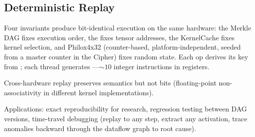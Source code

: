 \subsection{Deterministic Replay}

Four invariants produce bit-identical execution on the same hardware: the Merkle DAG fixes execution order, the  fixes tensor addresses, the KernelCache fixes kernel selection, and Philox4x32 (counter-based, platform-independent, seeded from a master counter in the Cipher) fixes random state.
Each op derives its key from ; each thread generates ---${\sim}10$ integer instructions in registers.

Cross-hardware replay preserves semantics but not bits (floating-point non-associativity in different kernel implementations).

Applications: exact reproducibility for research, regression testing between DAG versions, time-travel debugging (replay to any step, extract any activation, trace anomalies backward through the dataflow graph to root cause).
